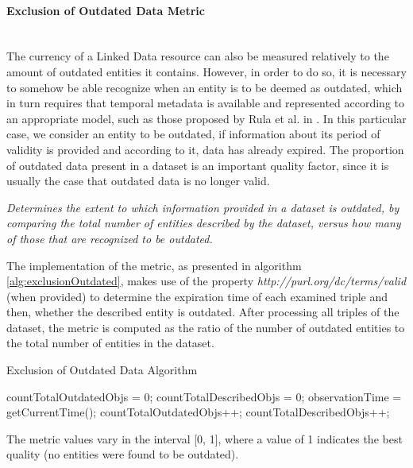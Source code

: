 
\paragraph{Exclusion of Outdated Data Metric}~\\ %
The currency of a Linked Data resource can also be measured relatively to the amount of outdated entities it contains. However, in order to do so, it is necessary to somehow be able recognize when an entity is to be deemed as outdated, which in turn requires that temporal metadata is available and represented according to an appropriate model, such as those proposed by Rula et al. in \cite{Rula2012A}. In this particular case, we consider an entity to be outdated, if information about its period of validity is provided and according to it, data has already expired. The proportion of outdated data present in a dataset is an important quality factor, since it is usually the case that outdated data is no longer valid.
\begin{mdframed}[style=metricdefinition]
\emph{Determines the extent to which information provided in a dataset is outdated, by comparing the total number of entities described by the dataset, versus how many of those that are recognized to be outdated.}
\end{mdframed}

The implementation of the metric, as presented in algorithm \ref{alg:exclusionOutdated}, makes use of the property \textit{http://purl.org/dc/terms/valid} (when provided) to determine the expiration time of each examined triple and then, whether the described entity is outdated. After processing all triples of the dataset, the metric is computed as the ratio of the number of outdated entities to the total number of entities in the dataset.
\begin{algorithm}
\caption{Exclusion of Outdated Data Algorithm} \label{alg:exclusionOutdated}
\begin{algorithmic}[1]
\State countTotalOutdatedObjs = 0;
\State countTotalDescribedObjs = 0;
\State observationTime = getCurrentTime();
\EndProcedure
{}
\State countTotalOutdatedObjs++;
\EndIf
\EndIf
{} 
\State countTotalDescribedObjs++;
\EndIf ~\\
\EndProcedure
\end{algorithmic}
\end{algorithm}
The metric values vary in the interval [0, 1], where a value of 1 indicates the best quality (no entities were found to be outdated).

